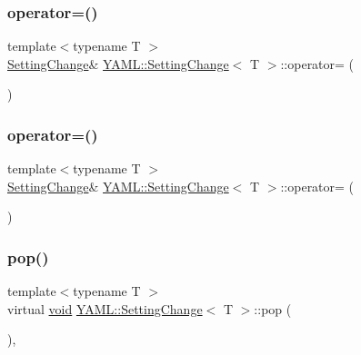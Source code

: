 \subsubsection{\texorpdfstring{operator=()}{operator=()}\hspace{0.1cm}{\footnotesize\ttfamily [1/2]}}
{\footnotesize\ttfamily template$<$typename T $>$ \\
\mbox{\hyperlink{class_y_a_m_l_1_1_setting_change}{Setting\+Change}}\& \mbox{\hyperlink{class_y_a_m_l_1_1_setting_change}{Y\+A\+M\+L\+::\+Setting\+Change}}$<$ T $>$\+::operator= (\begin{DoxyParamCaption}\item[{const \mbox{\hyperlink{class_y_a_m_l_1_1_setting_change}{Setting\+Change}}$<$ T $>$ \&}]{ }\end{DoxyParamCaption})\hspace{0.3cm}{\ttfamily [delete]}}

\mbox{\label{class_y_a_m_l_1_1_setting_change_a12adf18c935ea8c8c7f42d1e9a86cb20}} 
\subsubsection{\texorpdfstring{operator=()}{operator=()}\hspace{0.1cm}{\footnotesize\ttfamily [2/2]}}
{\footnotesize\ttfamily template$<$typename T $>$ \\
\mbox{\hyperlink{class_y_a_m_l_1_1_setting_change}{Setting\+Change}}\& \mbox{\hyperlink{class_y_a_m_l_1_1_setting_change}{Y\+A\+M\+L\+::\+Setting\+Change}}$<$ T $>$\+::operator= (\begin{DoxyParamCaption}\item[{\mbox{\hyperlink{class_y_a_m_l_1_1_setting_change}{Setting\+Change}}$<$ T $>$ \&\&}]{ }\end{DoxyParamCaption})\hspace{0.3cm}{\ttfamily [delete]}}

\mbox{\label{class_y_a_m_l_1_1_setting_change_a6af6bc2842d1992e1320fdd3e4d5350e}} 
\subsubsection{\texorpdfstring{pop()}{pop()}}
{\footnotesize\ttfamily template$<$typename T $>$ \\
virtual \mbox{\hyperlink{glad_8h_a950fc91edb4504f62f1c577bf4727c29}{void}} \mbox{\hyperlink{class_y_a_m_l_1_1_setting_change}{Y\+A\+M\+L\+::\+Setting\+Change}}$<$ T $>$\+::pop (\begin{DoxyParamCaption}{ }\end{DoxyParamCaption})\hspace{0.3cm}{\ttfamily [inline]}, {\ttfamily [virtual]}}



